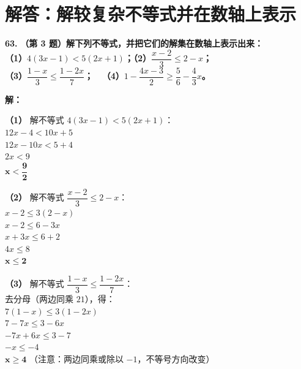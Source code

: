 \newpage


\section{解答：解较复杂不等式并在数轴上表示}

\vspace{0.6cm}

\textbf{\LARGE 63.} \textbf{（第 3 题）解下列不等式，并把它们的解集在数轴上表示出来：\\
（1）$4(3x-1) < 5(2x+1)$；\qquad\quad （2）$\dfrac{x-2}{3} \leqslant 2-x$；\\[1.5ex]
（3）$\dfrac{1-x}{3} \leqslant \dfrac{1-2x}{7}$；\qquad\qquad\,\,\,\, （4）$1 - \dfrac{4x-3}{2} \geqslant \dfrac{5}{6} - \dfrac{4}{3}x$。}

\vspace{0.4cm}
\textbf{解：}

\textbf{（1）} 解不等式 $4(3x-1) < 5(2x+1)$：\\
\hspace*{0.8cm} $12x - 4 < 10x + 5$\\
\hspace*{0.8cm} $12x - 10x < 5 + 4$\\
\hspace*{0.8cm} $2x < 9$\\
\hspace*{0.8cm} $\boldsymbol{x < \dfrac{9}{2}}$

\textbf{（2）} 解不等式 $\dfrac{x-2}{3} \leqslant 2-x$：\\
\hspace*{0.8cm} $x - 2 \leqslant 3(2 - x)$\\
\hspace*{0.8cm} $x - 2 \leqslant 6 - 3x$\\
\hspace*{0.8cm} $x + 3x \leqslant 6 + 2$\\
\hspace*{0.8cm} $4x \leqslant 8$\\
\hspace*{0.8cm} $\boldsymbol{x \leqslant 2}$

\textbf{（3）} 解不等式 $\dfrac{1-x}{3} \leqslant \dfrac{1-2x}{7}$：\\
\hspace*{0.8cm} 去分母（两边同乘 $21$），得：\\
\hspace*{0.8cm} $7(1 - x) \leqslant 3(1 - 2x)$\\
\hspace*{0.8cm} $7 - 7x \leqslant 3 - 6x$\\
\hspace*{0.8cm} $-7x + 6x \leqslant 3 - 7$\\
\hspace*{0.8cm} $-x \leqslant -4$\\
\hspace*{0.8cm} $\boldsymbol{x \geqslant 4}$ （注意：两边同乘或除以 $-1$，不等号方向改变）

